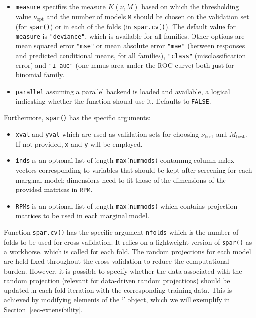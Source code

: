 \documentclass[
  article,
  nojss]{jss}
\newcommand{\class}[1]{`\code{#1}'}
\begin{document}
\begin{itemize}
\item
  \texttt{measure} specifies the measure \(K(\nu, M)\) based on which
  the thresholding value \(\nu_\text{opt}\) and the number of models
  \texttt{M} should be chosen on the validation set (for
  \texttt{spar()}) or in each of the folds (in \texttt{spar.cv()}). The
  default value for \texttt{measure} is \texttt{"deviance"}, which is
  available for all families. Other options are mean squared error
  \texttt{"mse"} or mean absolute error \texttt{"mae"} (between
  responses and predicted conditional means, for all families),
  \texttt{"class"} (misclassification error) and \texttt{"1-auc"} (one
  minus area under the ROC curve) both just for binomial family.
\item
  \texttt{parallel} assuming a parallel backend is loaded and available,
  a logical indicating whether the function should use it. Defaults to
  \texttt{FALSE}.
\end{itemize}

Furthermore, \texttt{spar()} has the specific arguments:

\begin{itemize}
\item
  \texttt{xval} and \texttt{yval} which are used as validation sets for
  choosing \(\nu_\text{best}\) and \(M_\text{best}\). If not provided,
  \texttt{x} and \texttt{y} will be employed.
\item
  \texttt{inds} is an optional list of length \texttt{max(nummods)}
  containing column index-vectors corresponding to variables that should
  be kept after screening for each marginal model; dimensions need to
  fit those of the dimensions of the provided matrices in \texttt{RPM}.
\item
  \texttt{RPMs} is an optional list of length \texttt{max(nummods)}
  which contains projection matrices to be used in each marginal model.
\end{itemize}

Function \texttt{spar.cv()} has the specific argument \texttt{nfolds}
which is the number of folds to be used for cross-validation. It relies
on a lightweight version of \texttt{spar()} as a workhorse, which is
called for each fold. The random projections for each model are held
fixed throughout the cross-validation to reduce the computational
burden. However, it is possible to specify whether the data associated
with the random projection (relevant for data-driven random projections)
should be updated in each fold iteration with the corresponding training
data. This is achieved by modifying elements of the
\class{randomprojection} object, which we will exemplify in
Section~\ref{sec-extensibility}.
\end{document}
